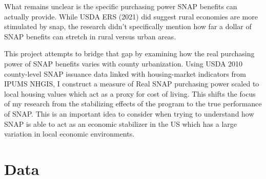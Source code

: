 \documentclass{article}
\begin{document}
What remains unclear is the specific purchasing power SNAP benefits can actually provide. While USDA ERS (2021) did suggest rural economies are more stimulated by snap, the research didn't specifically mention how far a dollar of SNAP benefits can stretch in rural versus urban areas. 

This project attempts to bridge that gap by examining how the real purchasing power of SNAP benefits varies with county urbanization. Using USDA 2010 county-level SNAP issuance data linked with housing-market indicators from IPUMS NHGIS, I construct a measure of Real SNAP purchasing power scaled to local housing values which act as a proxy for cost of living. This shifts the focus of my research from the stabilizing effects of the program to the true performance of SNAP. This is an important idea to consider when trying to understand how SNAP is able to act as an economic stabilizer in the US which has a large variation in local economic environments. 
\section{Data}
\begin{table}[H]
\centering
\caption{Summary Statistics}
\end{table}
\end{document}
